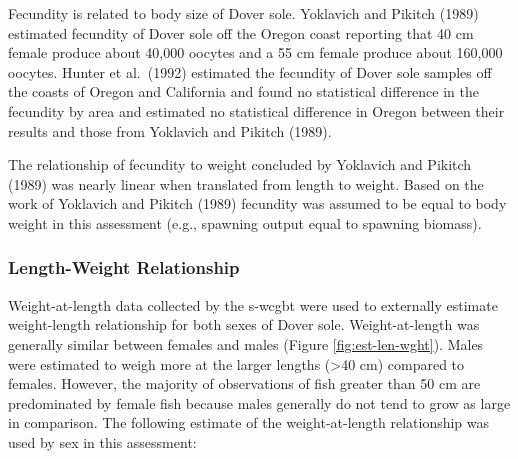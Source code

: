 \documentclass[11pt,
  english,
  a4paper,
]{article}
\begin{document}
\leavevmode\tagmcend\tagstructend\par


Fecundity is related to body size of Dover sole. Yoklavich and Pikitch {(1989)\leavevmode\tagmcend\tagstructend} estimated fecundity of Dover sole off the Oregon coast reporting that 40 cm female produce about 40,000 oocytes and a 55 cm female produce about 160,000 oocytes. Hunter et al.~{(1992)\leavevmode\tagmcend\tagstructend} estimated the fecundity of Dover sole samples off the coasts of Oregon and California and found no statistical difference in the fecundity by area and estimated no statistical difference in Oregon between their results and those from Yoklavich and Pikitch {(1989)\leavevmode\tagmcend\tagstructend}.

\leavevmode\tagmcend\tagstructend\par


The relationship of fecundity to weight concluded by Yoklavich and Pikitch {(1989)\leavevmode\tagmcend\tagstructend} was nearly linear when translated from length to weight. Based on the work of Yoklavich and Pikitch {(1989)\leavevmode\tagmcend\tagstructend} fecundity was assumed to be equal to body weight in this assessment (e.g., spawning output equal to spawning biomass).

\leavevmode\tagmcend\tagstructend\par


\hypertarget{length-weight-relationship}{%
\subsubsection{Length-Weight Relationship}\label{length-weight-relationship}}

\leavevmode\tagmcend\tagstructend


Weight-at-length data collected by the \gls{s-wcgbt} were used to externally estimate weight-length relationship for both sexes of Dover sole. Weight-at-length was generally similar between females and males (Figure \ref{fig:est-len-wght}). Males were estimated to weigh more at the larger lengths (\textgreater40 cm) compared to females. However, the majority of observations of fish greater than 50 cm are predominated by female fish because males generally do not tend to grow as large in comparison. The following estimate of the weight-at-length relationship was used by sex in this assessment:
\end{document}
